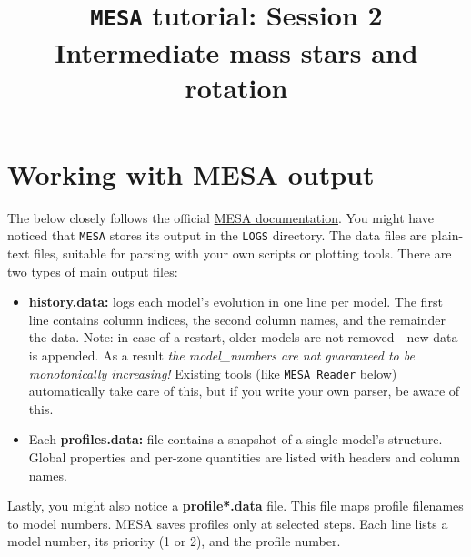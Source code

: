 \documentclass[11pt,a4paper]{article}
\begin{document}
\title{
    \textbf{\texttt{MESA} tutorial: Session 2} \\
    \textbf{\Large Intermediate mass stars and rotation}
}
\date{}
\maketitle
\vspace{-2cm}





\section{Working with MESA output}

The below closely follows the official \href{https://docs.mesastar.org/en/latest/using_mesa/output.html}{MESA documentation}.
You might have noticed that \texttt{MESA} stores its output in the \texttt{LOGS} directory. 
The data files are plain-text files, suitable for parsing with your own scripts or plotting tools. 
%
There are two types of main output files:

\begin{itemize}
  \item \textbf{history.data:} logs each model's evolution in one line per model. The first line contains column indices, the second column names, and the remainder the data. Note: in case of a restart, older models are not removed—new data is appended. As a result \textit{the model\_numbers are not guaranteed to be monotonically increasing!} Existing tools (like \texttt{MESA Reader} below) automatically take care of this, but if you write your own parser, be aware of this.
  
  \item Each \textbf{profiles.data:} file contains a snapshot of a single model's structure. Global properties and per-zone quantities are listed with headers and column names.

\end{itemize}


Lastly, you might also notice a \textbf{profile*.data} file.
  This file maps profile filenames to model numbers. MESA saves profiles only at selected steps. Each line lists a model number, its priority (1 or 2), and the profile number.

\end{document}

